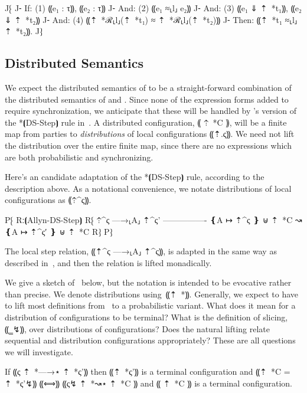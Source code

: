 \begin{theorem}[PMTO\%]\label{thm:lang-pmto}
  J⁅
  J⁃ If:  (1) ⸨e₁ : τ⸩, ⸨e₂ : τ⸩
  J⁃ And: (2) ⸨e₁ ≈⸤l⸥ e₂⸩
  J⁃ And: (3) ⸨e₁ ⇓ ⇡~*{t₁}⸩, ⸨e₂ ⇓ ⇡~*{t₂}⸩
  J⁃ And: (4) ⸨⇡~*ℛ⸤l⸥(⇡~*{t₁}) ≈ ⇡~*ℛ⸤l⸥(⇡~*{t₂})⸩
  J⁃ Then: ⸨⇡~*{t₁} ≈⸤l⸥ ⇡~*{t₂}⸩.
  J⁆
\end{theorem}

\subsection{Distributed Semantics}
\label{subsec:proposal-design-dist}

We expect the distributed semantics of \lang to be a straight-forward combination of the
distributed semantics of \mpc and \obliv. Since none of the expression forms added to
\lang require synchronization, we anticipate that these will be handled by \lang's version
of the *⦗DS-Step⦘ rule in~. A \lang distributed configuration, ⸨ ⇡~*C ⸩,
will be a finite map from parties to \emph{distributions} of local configurations ⸨⇡.ς⸩.
We need not lift the distribution over the entire finite map, since there are no expressions
which are both probabilistic and synchronizing.

Here's an candidate adaptation of the *⦗DS-Step⦘ rule, according to the description above. As
a notational convenience, we notate distributions of local configurations as ⸨⇡^ς⸩.

P⁅ Rː⦗Allyn-DS-Step⦘
   R⁅ ⇡^ς —→⸤A⸥ ⇡^{ς'}
      ----------------
      ❴A ↦ ⇡^ς ❵ ⊎ ⇡~*C ↝ ❴A ↦ ⇡^{ς′} ❵ ⊎ ⇡~*C
   R⁆
P⁆

The local step relation, ⸨⇡^ς —→⸤A⸥ ⇡^ς⸩, is adapted in the same way as described
in~, and then the relation is lifted monadically.

We give a sketch of~ below, but the notation is intended to be evocative rather
than precise. We denote distributions using~⸨⇡~*{}⸩. Generally, we expect to have to lift most definitions from~
to a probabilistic variant. What does it mean for a distribution of configurations to be terminal? What is the definition of slicing, ⸨‗↯⸩,
over distributions of configurations? Does the natural lifting relate sequential and distribution configurations appropriately? These
are all questions we will investigate.

\begin{theorem}\label{thm:lang-simulation}
    If ⸨ς ⇡~*{—→}⋆ ⇡~*{ς'}⸩ then ⸨⇡~*{ς'}⸩ is a terminal configuration and ⸨⇡~*C = ⇡~*{ς'}↯⸩ ⸨⟺⸩ ⸨ς↯ ⇡~*{↝}⋆ ⇡~*C ⸩ and ⸨ ⇡~*C ⸩ is a terminal configuration.
\end{theorem}

